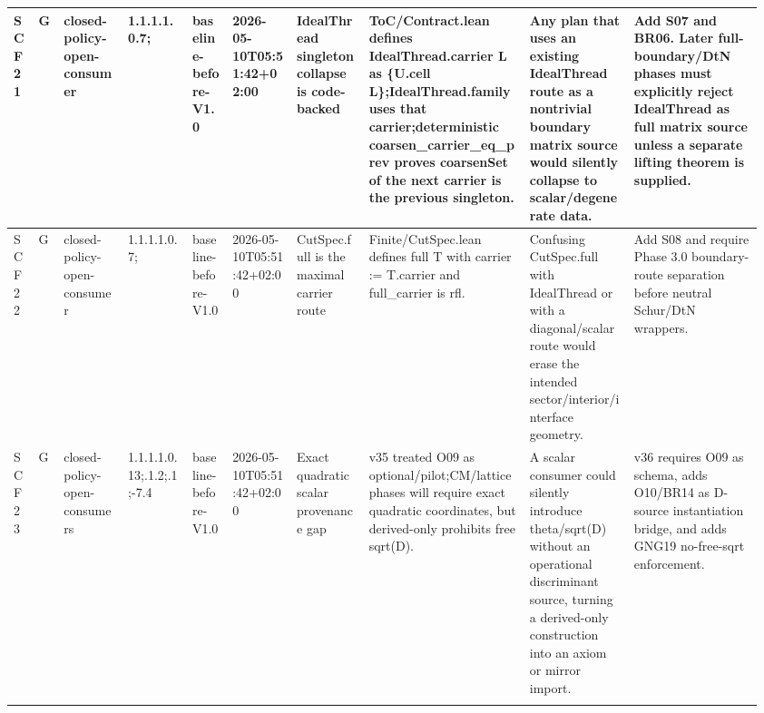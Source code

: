 \begin{longtable}{L{0.03\linewidth} L{0.026\linewidth} L{0.087\linewidth} L{0.085\linewidth} L{0.052\linewidth} L{0.085\linewidth} L{0.095\linewidth} L{0.205\linewidth} L{0.13\linewidth} L{0.165\linewidth}}
\hline
\addlinespace[0.24em]
SCF21 & G & closed-policy-open-consumer & 1.1.1.1.0.7; & baseline-before-V1.0 & 2026-05-10T05:51:42+02:00 & IdealThread singleton collapse is code-backed & ToC/\allowbreak{}Contract.lean defines IdealThread.carrier L as \{U.cell L\};\newline IdealThread.family uses that carrier;\newline deterministic coarsen\_carrier\_eq\_prev proves coarsenSet of the next carrier is the previous singleton. & Any plan that uses an existing IdealThread route as a nontrivial boundary matrix source would silently collapse to scalar/\allowbreak{}degenerate data. & Add S07 and BR06. Later full-boundary/\allowbreak{}DtN phases must explicitly reject IdealThread as full matrix source unless a separate lifting theorem is supplied.\\
\hline
\addlinespace[0.24em]
SCF22 & G & closed-policy-open-consumer & 1.1.1.1.0.7; & baseline-before-V1.0 & 2026-05-10T05:51:42+02:00 & CutSpec.full is the maximal carrier route & Finite/\allowbreak{}CutSpec.lean defines full T with carrier := T.carrier and full\_carrier is rfl. & Confusing CutSpec.full with IdealThread or with a diagonal/\allowbreak{}scalar route would erase the intended sector/\allowbreak{}interior/\allowbreak{}interface geometry. & Add S08 and require Phase 3.0 boundary-route separation before neutral Schur/\allowbreak{}DtN wrappers.\\
\hline
\addlinespace[0.24em]
SCF23 & G & closed-policy-open-consumers & 1.1.1.1.0.13;.1.2;.1;-7.4 & baseline-before-V1.0 & 2026-05-10T05:51:42+02:00 & Exact quadratic scalar provenance gap & v35 treated O09 as optional/\allowbreak{}pilot;\newline CM/\allowbreak{}lattice phases will require exact quadratic coordinates, but derived-only prohibits free sqrt(D). & A scalar consumer could silently introduce theta/\allowbreak{}sqrt(D) without an operational discriminant source, turning a derived-only construction into an axiom or mirror import. & v36 requires O09 as schema, adds O10/\allowbreak{}BR14 as D-source instantiation bridge, and adds GNG19 no-free-sqrt enforcement.\\
\hline
\addlinespace[0.24em]

\end{longtable}
